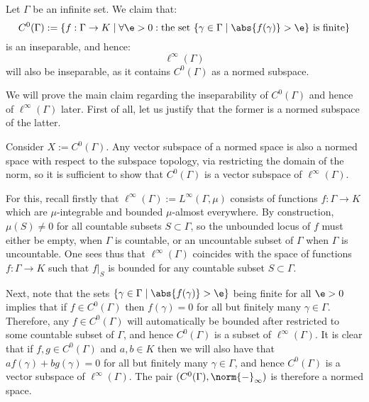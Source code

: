         \begin{example} \label{example: ell_infinity_spaces_of_infinite_dimensions_is_inseparable}
        
            Let $\Gamma$ be an infinite set. We claim that:
                $$C^0(\Gamma) := \{ f: \Gamma \to K \mid \forall \e > 0: \text{the set $\{ \gamma \in \Gamma \mid \abs{f(\gamma)} > \e \}$ is finite} \}$$
            is an inseparable, and hence:
                $$\ell^{\infty}(\Gamma)$$
            will also be inseparable, as it contains $C^0(\Gamma)$ as a normed subspace.

            We will prove the main claim regarding the inseparability of $C^0(\Gamma)$ and hence of $\ell^{\infty}(\Gamma)$ later. First of all, let us justify that the former is a normed subspace of the latter. 
        
            Consider $X := C^0(\Gamma)$. Any vector subspace of a normed space is also a normed space with respect to the subspace topology, via restricting the domain of the norm, so it is sufficient to show that $C^0(\Gamma)$ is a vector subspace of $\ell^{\infty}(\Gamma)$.
                    
            For this, recall firstly that $\ell^{\infty}(\Gamma) := L^{\infty}(\Gamma, \mu)$ consists of functions $f: \Gamma \to K$ which are $\mu$-integrable and bounded $\mu$-almost everywhere. By construction, $\mu(S) \not = 0$ for all countable subsets $S \subset \Gamma$, so the unbounded locus of $f$ must either be empty, when $\Gamma$ is countable, or an uncountable subset of $\Gamma$ when $\Gamma$ is uncountable. One sees thus that $\ell^{\infty}(\Gamma)$ coincides with the space of functions $f: \Gamma \to K$ such that $f|_S$ is bounded for any countable subset $S \subset \Gamma$.
            
            Next, note that the sets $\{ \gamma \in \Gamma \mid \abs{f(\gamma)} > \e \}$ being finite for all $\e > 0$ implies that if $f \in C^0(\Gamma)$ then $f(\gamma) = 0$ for all but finitely many $\gamma \in \Gamma$. Therefore, any $f \in C^0(\Gamma)$ will automatically be bounded after restricted to some countable subset of $\Gamma$, and hence $C^0(\Gamma)$ is a subset of $\ell^{\infty}(\Gamma)$. It is clear that if $f, g \in C^0(\Gamma)$ and $a, b \in K$ then we will also have that $af(\gamma) + bg(\gamma) = 0$ for all but finitely many $\gamma \in \Gamma$, and hence $C^0(\Gamma)$ is a vector subspace of $\ell^{\infty}(\Gamma)$. The pair $( C^0(\Gamma), \norm{-}_{\infty} )$ is therefore a normed space.
        \end{example}
